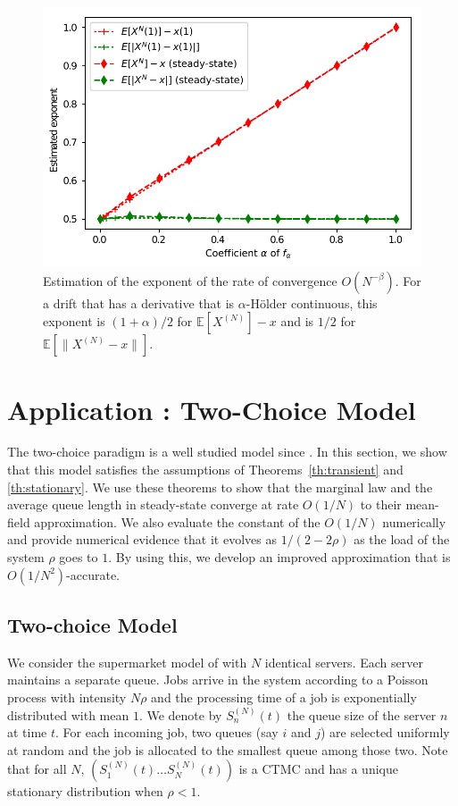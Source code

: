 \documentclass[acmlarge]{acmart}
\newcommand\SN{S^{(N)}}
\newcommand\XN{X^{(N)}}
\newcommand\sesp[1]{\mathbb{E}[#1]}
\newcommand\snorm[1]{\|#1\|}
\begin{document}
\begin{figure}[ht]
  \centering
  \includegraphics[width=0.90\linewidth]{exponent_birthDeath}
  \caption{Estimation of the exponent of the rate of convergence
    $O(N^{-\beta})$. For a drift that has a derivative that is
    $\alpha$-Hölder continuous, this exponent is $(1+\alpha)/2$ for
    $\sesp{\XN}-x$ and is $1/2$ for $\sesp{\snorm{\XN-x}}$.}
  \label{fig:expo_BD}
\end{figure}


\section{Application : Two-Choice Model}
\label{sec:two-choice}

The two-choice paradigm is a well studied model since
\cite{mitzenmacher1996power,vvedenskaya1996queueing}. In this section,
we show that this model satisfies the assumptions of
Theorems~\ref{th:transient} and \ref{th:stationary}. We use these
theorems to show that the marginal law and the average queue length in
steady-state converge at rate $O(1/N)$ to their mean-field
approximation. We also evaluate the constant of the $O(1/N)$
numerically and provide numerical evidence that it evolves as
$1/(2-2\rho)$ as the load of the system $\rho$ goes to $1$. By using
this, we develop an improved approximation that is
$O(1/N^2)$-accurate.


\subsection{Two-choice Model}
\label{sec:two-choice-model}

We consider the supermarket model of \cite{mitzenmacher1996power} with
$N$ identical servers. Each server maintains a separate queue. Jobs
arrive in the system according to a Poisson process with intensity
$N\rho$ and the processing time of a job is exponentially distributed
with mean $1$. We denote by $\SN_n(t)$ the queue size of the server
$n$ at time $t$. For each incoming job, two queues (say $i$ and $j$)
are selected uniformly at random and the job is allocated to the
smallest queue among those two. Note that for all $N$,
$(\SN_1(t)\dots \SN_N(t))$ is a CTMC and has a unique stationary
distribution when $\rho<1$.
\end{document}
